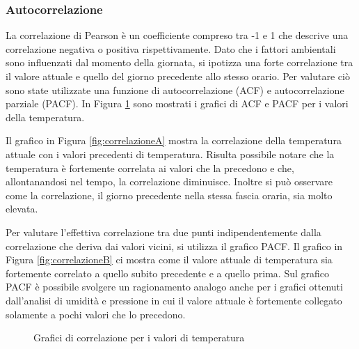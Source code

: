 \documentclass{article}
\begin{document}
\subsubsection{Autocorrelazione}
La correlazione di Pearson è un coefficiente compreso tra -1 e 1 che descrive una correlazione negativa o positiva rispettivamente. Dato che i fattori ambientali sono influenzati dal momento della giornata, si ipotizza una forte correlazione tra il valore attuale e quello del giorno precedente allo stesso orario. Per valutare ciò sono state utilizzate una funzione di autocorrelazione (ACF) e autocorrelazione parziale (PACF). In Figura \ref{fig:correlazione} sono mostrati i grafici di ACF e PACF per i valori della temperatura.

Il grafico in Figura \ref{fig:correlazioneA} mostra la correlazione della temperatura attuale con i valori precedenti di temperatura. Risulta possibile notare che la temperatura è fortemente correlata ai valori che la precedono e che, allontanandosi nel tempo, la correlazione diminuisce. Inoltre si può osservare come la correlazione, il giorno precedente nella stessa fascia oraria, sia molto elevata.

Per valutare l'effettiva correlazione tra due punti indipendentemente dalla correlazione che deriva dai valori vicini, si utilizza il grafico PACF. Il grafico in Figura \ref{fig:correlazioneB} ci mostra come il valore attuale di temperatura sia fortemente correlato a quello subito precedente e a quello prima. Sul grafico PACF è possibile svolgere un ragionamento analogo anche per i grafici ottenuti dall'analisi di umidità e pressione in cui il valore attuale è fortemente collegato solamente a pochi valori che lo precedono.


\begin{figure}%
    \centering
    \qquad
    \caption{Grafici di correlazione per i valori di temperatura}
    \label{fig:correlazione}
\end{figure}
\end{document}
